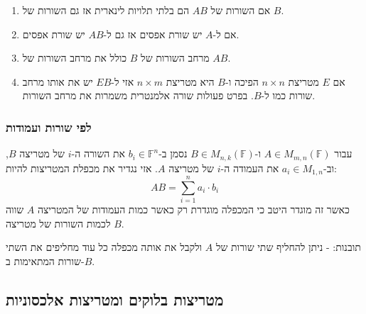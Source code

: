 \documentclass{tstextbook}
\begin{document}
\begin{enumerate}
  \item אם השורות של \(AB\) הם בלתי תלויות לינארית אז גם השורות של \(B\). 


  \item אם ל-\(A\) יש שורת אפסים אז גם ל-\(AB\) יש שורת אפסים. 


  \item מרחב השורות של \(B\) כולל את מרחב השורות של \(AB\). 


  \item אם \(E\) מטריצת \(n\times n\) הפיכה ו-\(B\) היא מטריצת \(n\times m\) אזי ל-\(EB\) יש את אותו מרחב שורות כמו ל-\(B\). בפרט פעולות שורה אלמנטרית משמרות את מרחב השורות. 


\end{enumerate}
\subsubsection{לפי שורות ועמודות}

\begin{definition}
עבור \(A \in M_{m,n}\left( \mathbb{F}  \right)\) ו-\(B \in M_{n,k}\left( \mathbb{F}  \right)\) נסמן ב-\(b_{i}\in \mathbb{F} ^{n}\) את השורה ה-\(i\) של מטריצה \(B\), וב-\(a_{i}\in M_{1,n}\) את העמודה ה-\(i\) של מטריצה \(A\). אזי נגדיר את מכפלת המטריצות להיות:
$$AB=\sum_{i=1}^{n} a_{i}\cdot b_{i}$$
כאשר זה מוגדר היטב כי המכפלה מוגדרת רק כאשר כמות העמודות של המטריצה \(A\) שווה לכמות השורות של מטריצה \(B\).

\end{definition}
תובנות:
- ניתן להחליף שתי שורות של \(A\) ולקבל את אותה מכפלה כל עוד מחליפים את השתי שורות המתאימות ב-\(B\).

\subsection{מטריצות בלוקים ומטריצות אלכסוניות}
\end{document}
